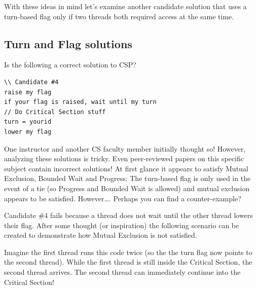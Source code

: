 With these ideas in mind let's examine another candidate solution that uses a turn-based flag only if two threads both required access at the same time.

\subsection{Turn and Flag solutions}\label{turn-and-flag-solutions}

Is the following a correct solution to CSP?

\begin{lstlisting}
\\ Candidate #4
raise my flag
if your flag is raised, wait until my turn
// Do Critical Section stuff
turn = yourid
lower my flag
\end{lstlisting}

One instructor and another CS faculty member initially thought so! However, analyzing these solutions is tricky. Even peer-reviewed papers on this specific subject contain incorrect solutions! At first glance it appears to satisfy Mutual Exclusion, Bounded Wait and Progress: The turn-based flag is only used in the event of a tie (so Progress and Bounded Wait is allowed) and mutual exclusion appears to be satisfied. However\ldots{}. Perhaps you can find a counter-example?

Candidate \#4 fails because a thread does not wait until the other thread lowers their flag. After some thought (or inspiration) the following scenario can be created to demonstrate how Mutual Exclusion is not satisfied.

Imagine the first thread runs this code twice (so the the turn flag now points to the second thread). While the first thread is still inside the Critical Section, the second thread arrives. The second thread can immediately continue into the Critical Section!

